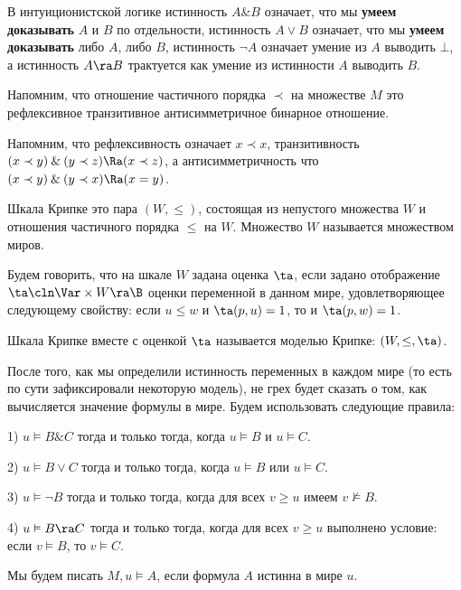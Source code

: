 \documentclass[a4paper,draft]{article}
\let\amper\&
\def\&{\mathbin{\amper}}
\begin{document}
В интуиционистской логике истинность $A \& B$ означает, что мы \textbf{умеем доказывать} $A$ и $B$ по отдельности,
истинность $A \vee B$ означает, что мы \textbf{умеем доказывать} либо $A$, либо $B$,
истинность $\neg A$ означает умение из $A$ выводить $\bot$, а истинность $A \ra B$ трактуется как умение
из истинности $A$ выводить $B$.

Напомним, что отношение частичного порядка $\prec$ на множестве $M$ это рефлексивное транзитивное
антисимметричное бинарное отношение.

Напомним, что рефлексивность означает $x \prec x$, транзитивность $(x \prec y) \& (y \prec z) \Ra (x \prec z)$,
а антисимметричность что $(x \prec y) \& (y \prec x) \Ra (x = y)$.

\begin{df}
  Шкала Крипке это пара $(W, \le)$, состоящая из непустого множества $W$ и отношения частичного порядка $\le$ на $W$.
  Множество $W$ называется множеством миров.
\end{df}

\begin{df}
  Будем говорить, что на шкале $W$ задана оценка $\ta$, если задано отображение
  $\ta\cln \Var \times W \ra \B$ оценки переменной в данном мире, удовлетворяющее следующему
  свойству: если $u \le w$ и $\ta(p,u) = 1$, то и $\ta(p,w) = 1$.
\end{df}

\begin{df}
  Шкала Крипке вместе с оценкой $\ta$ называется моделью Крипке: $(W,\le,\ta)$.
\end{df}

После того, как мы определили истинность переменных в каждом мире (то есть по сути зафиксировали
некоторую модель), не грех будет
сказать о том, как вычисляется значение формулы в мире.
Будем использовать следующие правила:

1) $u\vDash B \& C$ тогда и только тогда, когда $u \vDash B$ и $u \vDash C$.\par
2) $u\vDash B \vee C$ тогда и только тогда, когда $u \vDash B$ или $u\vDash C$.\par
3) $u\vDash \neg B$ тогда и только тогда, когда для всех $v \ge u$ имеем $v \nvDash B$.\par
4) $u\vDash B \ra C$ тогда и только тогда, когда для всех $v \ge u$ выполнено условие: если $v \vDash B$, то $v\vDash C$.


\begin{denote}
Мы будем писать $M, u\vDash A$, если формула $A$ истинна в мире $u$.
\end{denote}
\end{document}
